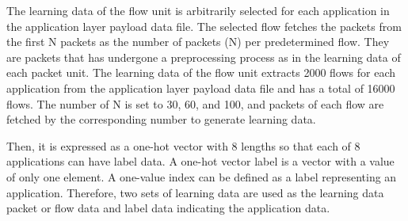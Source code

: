 The learning data of the flow unit is arbitrarily selected for each application in the application layer payload data file.
The selected flow fetches the packets from the first N packets as the number of packets (N) per predetermined flow.
They are  packets that has undergone a preprocessing process as in the learning data of each packet unit.
The learning data of the flow unit extracts 2000 flows for each application from the application layer payload data file and has a total of 16000 flows.
The number of N is set to 30, 60, and 100, and packets of each flow are fetched by the corresponding number to generate learning data.

Then, it is expressed as a one-hot vector with 8 lengths so that each of 8 applications can have label data.
A one-hot vector label is a vector with a value of only one element.
A one-value index can be defined as a label representing an application.
Therefore, two sets of learning data are used as the learning data packet or flow data and label data indicating the application data.